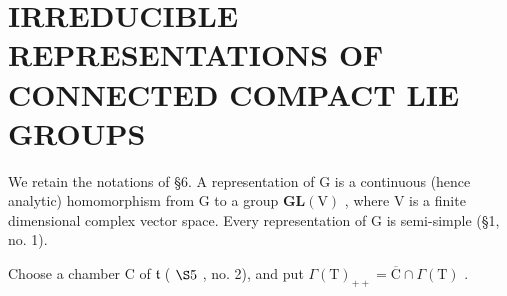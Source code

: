 \section{IRREDUCIBLE REPRESENTATIONS OF CONNECTED COMPACT LIE GROUPS}

We retain the notations of §6. A representation of G is a continuous (hence analytic) homomorphism from G to a group \(\mathbf{GL}(\mathrm{V})\) , where V is a finite dimensional complex vector space. Every representation of G is semi-simple (§1, no. 1).

Choose a chamber C of \(\mathfrak{t}\) ( \(\S 5\) , no. 2), and put \(\Gamma(\mathrm{T})_{++} = \overline{\mathrm{C}} \cap \Gamma(\mathrm{T})\) .

